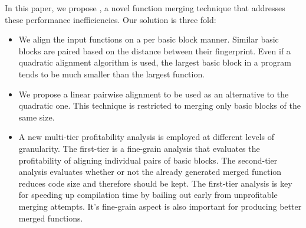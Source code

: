 In this paper, we propose {\ProjName}, a novel function merging technique that addresses these performance inefficiencies.
Our solution is three fold:
\begin{itemize} %
   \item We align the input functions on a per basic block manner.
   Similar basic blocks are paired based on the distance between their fingerprint.
   Even if a quadratic alignment algorithm is used, the largest basic block in a program tends to be much smaller than the largest function.
   \item We propose a linear pairwise alignment to be used as an alternative to the quadratic one.
   This technique is restricted to merging only basic blocks of the same size.
   \item A new multi-tier profitability analysis is employed at different levels of granularity.
   The first-tier is a fine-grain analysis that evaluates the profitability of aligning individual pairs of basic blocks.
   The second-tier analysis evaluates whether or not the already generated merged function reduces code size and therefore should be kept.
   The first-tier analysis is key for speeding up compilation time by bailing out early from unprofitable merging attempts.
   It's fine-grain aspect is also important for producing better merged functions.
\end{itemize}


